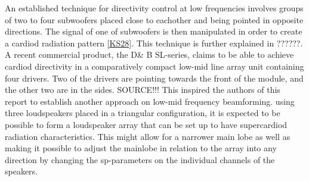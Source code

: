 An established technique for directivity control at low frequencies involves groups of two to four subwoofers placed close to eachother and being pointed in opposite directions. The signal of one of subwoofers is then manipulated in order to create a cardiod radiation pattern \autoref{KS28}. This technique is further explained in ??????.\\
A recent commercial product, the D\& B SL-series, claims to be able to achieve cardiod directivity in a comparatively compact low-mid line array unit containing four drivers. Two of the drivers are pointing towards the front of the module, and the other two are in the sides. SOURCE!!! This inspired the authors of this report to establish another approach on low-mid frequency beamforming. using three loudspeakers placed in a triangular configuration, it is expected to be possible to form a loudspeaker array that can be set up to have supercardiod radiation characteristics. This might allow for a narrower main lobe as well as making it possible to adjust the mainlobe in relation to the array into any direction by changing the \gls{sp}-parameters on the individual channels of the speakers.






